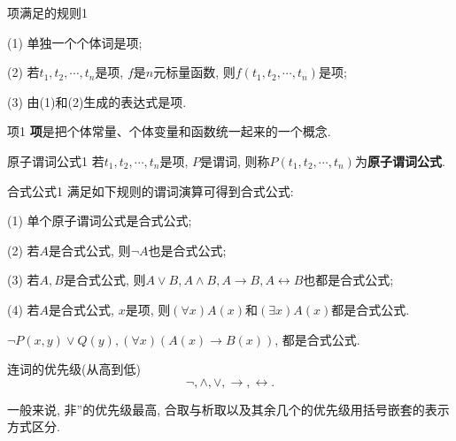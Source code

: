 \begin{myprop}{项满足的规则}{1}

    (1) 单独一个个体词是项;

    (2) 若$t_1,t_2,\cdots,t_n$是项, $f$是$n$元标量函数, 则$f(t_1,t_2,\cdots,t_n)$是项;

    (3) 由(1)和(2)生成的表达式是项.
\end{myprop}
\begin{myprop}{项}{1}
\textbf{项}是把个体常量、个体变量和函数统一起来的一个概念.
\end{myprop}
\begin{mydef}{原子谓词公式}{1}
若$t_1,t_2,\cdots,t_n$是项, $P$是谓词, 则称$P(t_1,t_2,\cdots,t_n)$为\textbf{原子谓词公式}.
\end{mydef}
\begin{mydef}{合式公式}{1}
满足如下规则的谓词演算可得到合式公式:

    (1) 单个原子谓词公式是合式公式;

    (2) 若$A$是合式公式, 则$\neg A$也是合式公式;

    (3) 若$A,B$是合式公式, 则$A\vee B, A\wedge B, A\rightarrow B, A\leftrightarrow B$也都是合式公式;

    (4) 若$A$是合式公式, $x$是项, 则$(\forall x)A(x)$和$(\exists  x)A(x)$都是合式公式.
\end{mydef}
\begin{example}
  $\neg P(x,y) \vee Q(y), (\forall x)(A(x)\rightarrow B(x))$, 都是合式公式.
\end{example}

连词的优先级(从高到低)
$$\neg,\wedge,\vee, \rightarrow,\leftrightarrow.$$

\begin{remark}
一般来说, 非”的优先级最高, 合取与析取以及其余几个的优先级用括号嵌套的表示方式区分.
\end{remark}

